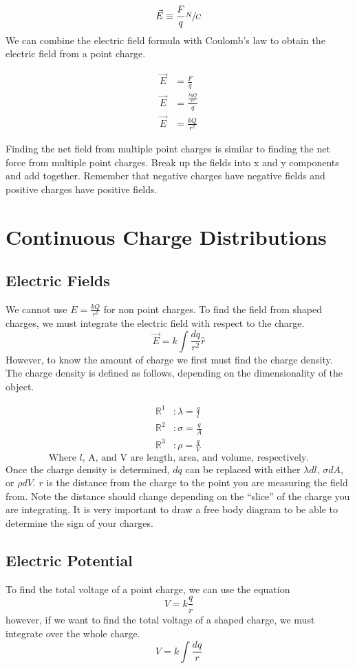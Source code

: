 \documentclass{article}
\begin{document}
\[ \vec{E} \equiv \frac{F}{q} \sfrac{N}{C} \]
We can combine the electric field formula with Coulomb's law to obtain the electric field from a point charge.

\begin{align}
  \vec{E} &= \frac{F}{q} \\
  \vec{E} &= \frac{\frac{kqQ}{r^2}}{q} \\
  \vec{E} &= \frac{kQ}{r^2}
 \end{align}

Finding the net field from multiple point charges is similar to finding the net force from multiple point charges.  Break up the fields into x and y components and add together.  Remember that negative charges have negative fields and positive charges have positive fields.
\section{Continuous Charge Distributions}
\subsection{Electric Fields}
We cannot use \( E = \frac{kQ}{r^2} \) for non point charges.  To find the field from shaped charges, we must integrate the electric field with respect to the charge.
\[ \vec{E} = k \int \frac{dq}{r^2} \hat{r} \]
However, to know the amount of charge we first must find the charge density.  The charge density is defined as follows, depending on the dimensionality of the object.

\begin{align}
  \mathbb{R}^1 &: \lambda = \frac{q}{l} \\
  \mathbb{R}^2 &: \sigma = \frac{q}{A} \\
  \mathbb{R}^3 &: \rho = \frac{q}{V}
\end{align}
\[  \text{Where $l$, A, and V are length, area, and volume, respectively.} \]
Once the charge density is determined, $dq$ can be replaced with either $\lambda dl$, $\sigma dA$, or $\rho dV$. $r$ is the distance from the charge to the point you are measuring the field from.  Note the distance should change depending on the ``slice'' of the charge you are integrating.
It is very important to draw a free body diagram to be able to determine the sign of your charges.
\subsection{Electric Potential}
To find the total voltage of a point charge, we can use the equation
\[V = k\frac{q}{r}\]
however, if we want to find the total voltage of a shaped charge, we must integrate over the whole charge.
\[V = k\int\frac{dq}{r}\]
\end{document}
